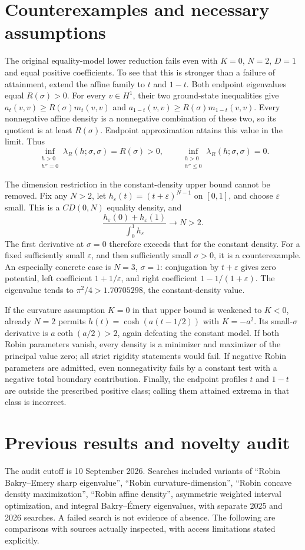 \documentclass[12pt]{amsart}
\theoremstyle{definition}
\theoremstyle{remark}
\numberwithin{equation}{section}
\begin{document}
\section{Counterexamples and necessary assumptions}
The original equality-model lower reduction fails even with $K=0$, $N=2$, $D=1$ and equal positive coefficients. To see that this is stronger than a failure of attainment, extend the affine family to $t$ and $1-t$. Both endpoint eigenvalues equal $R(\sigma)>0$. For every $v\in H^1$, their two ground-state inequalities give
$a_t(v,v)\ge R(\sigma)m_t(v,v)$ and
$a_{1-t}(v,v)\ge R(\sigma)m_{1-t}(v,v)$.
Every nonnegative affine density is a nonnegative combination of these two, so its quotient is at least $R(\sigma)$. Endpoint approximation attains this value in the limit. Thus
\[
 \inf_{\substack{h>0\\h''=0}}\lambda_R(h;\sigma,\sigma)=R(\sigma)>0,
 \qquad
 \inf_{\substack{h>0\\h''\le0}}\lambda_R(h;\sigma,\sigma)=0.
\]

The dimension restriction in the constant-density upper bound cannot be removed. Fix any $N>2$, let $h_\varepsilon(t)=(t+\varepsilon)^{N-1}$ on $[0,1]$, and choose $\varepsilon$ small. This is a $CD(0,N)$ equality density, and
\[
 \frac{h_\varepsilon(0)+h_\varepsilon(1)}{\int_0^1h_\varepsilon}
 \longrightarrow N>2.
\]
The first derivative at $\sigma=0$ therefore exceeds that for the constant density. For a fixed sufficiently small $\varepsilon$, and then sufficiently small $\sigma>0$, it is a counterexample. An especially concrete case is $N=3$, $\sigma=1$: conjugation by $t+\varepsilon$ gives zero potential, left coefficient $1+1/\varepsilon$, and right coefficient $1-1/(1+\varepsilon)$. The eigenvalue tends to $\pi^2/4>1.70705298$, the constant-density value.

If the curvature assumption $K=0$ in that upper bound is weakened to $K<0$, already $N=2$ permits $h(t)=\cosh(a(t-1/2))$ with $K=-a^2$. Its small-$\sigma$ derivative is $a\coth(a/2)>2$, again defeating the constant model. If both Robin parameters vanish, every density is a minimizer and maximizer of the principal value zero; all strict rigidity statements would fail. If negative Robin parameters are admitted, even nonnegativity fails by a constant test with a negative total boundary contribution. Finally, the endpoint profiles $t$ and $1-t$ are outside the prescribed positive class; calling them attained extrema in that class is incorrect.

\section{Previous results and novelty audit}
The audit cutoff is 10 September 2026. Searches included variants of ``Robin Bakry--Emery sharp eigenvalue'', ``Robin curvature-dimension'', ``Robin concave density maximization'', ``Robin affine density'', asymmetric weighted interval optimization, and integral Bakry--\'Emery eigenvalues, with separate 2025 and 2026 searches. A failed search is not evidence of absence. The following are comparisons with sources actually inspected, with access limitations stated explicitly.
\end{document}
